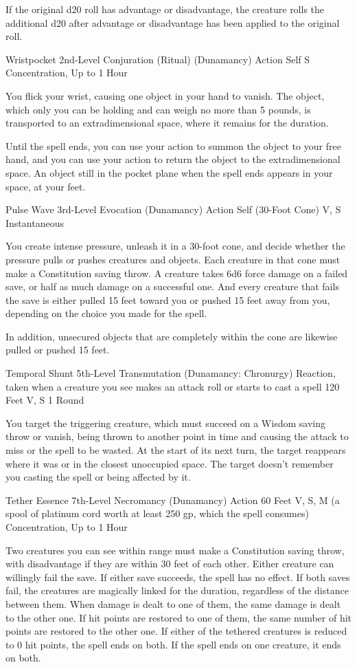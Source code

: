 If the original d20 roll has advantage or disadvantage, the creature rolls the additional d20 after advantage or disadvantage has been applied to the original roll.

\DndSpellHeader
  {Wristpocket}
  {2nd-Level Conjuration (Ritual) (Dunamancy)}
  {Action}
  {Self}
  {S}
  {Concentration, Up to 1 Hour}

\noindent You flick your wrist, causing one object in your hand to vanish. The object, which only you can be holding and can weigh no more than 5 pounds, is transported to an extradimensional space, where it remains for the duration.

Until the spell ends, you can use your action to summon the object to your free hand, and you can use your action to return the object to the extradimensional space. An object still in the pocket plane when the spell ends appears in your space, at your feet.

\DndSpellHeader
  {Pulse Wave}
  {3rd-Level Evocation (Dunamancy)}
  {Action}
  {Self (30-Foot Cone)}
  {V, S}
  {Instantaneous}

\noindent You create intense pressure, unleash it in a 30-foot cone, and decide whether the pressure pulls or pushes creatures and objects. Each creature in that cone must make a Constitution saving throw. A creature takes 6d6 force damage on a failed save, or half as much damage on a successful one. And every creature that fails the save is either pulled 15 feet toward you or pushed 15 feet away from you, depending on the choice you made for the spell.

In addition, unsecured objects that are completely within the cone are likewise pulled or pushed 15 feet.

\DndSpellHeader
  {Temporal Shunt}
  {5th-Level Transmutation (Dunamancy: Chronurgy)}
  {Reaction, taken when a creature you see makes an attack roll or starts to cast a spell}
  {120 Feet}
  {V, S}
  {1 Round}

\noindent You target the triggering creature, which must succeed on a Wisdom saving throw or vanish, being thrown to another point in time and causing the attack to miss or the spell to be wasted. At the start of its next turn, the target reappears where it was or in the closest unoccupied space. The target doesn't remember you casting the spell or being affected by it.

\DndSpellHeader
  {Tether Essence}
  {7th-Level Necromancy (Dunamancy)}
  {Action}
  {60 Feet}
  {V, S, M (a spool of platinum cord worth at least 250 gp, which the spell consumes)}
  {Concentration, Up to 1 Hour}

\noindent Two creatures you can see within range must make a Constitution saving throw, with disadvantage if they are within 30 feet of each other. Either creature can willingly fail the save. If either save succeeds, the spell has no effect. If both saves fail, the creatures are magically linked for the duration, regardless of the distance between them. When damage is dealt to one of them, the same damage is dealt to the other one. If hit points are restored to one of them, the same number of hit points are restored to the other one. If either of the tethered creatures is reduced to 0 hit points, the spell ends on both. If the spell ends on one creature, it ends on both.